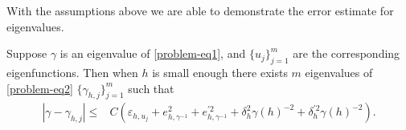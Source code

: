 \documentclass[leqno,CJK]{siamltex704}
\numberwithin{equation}{section}
\begin{document}
	With the assumptions above we are able to demonstrate the error estimate for eigenvalues.
	\begin{theorem}\label{thm-eigenvalue}
		Suppose $\gamma$ is an eigenvalue of \eqref{problem-eq1}, and $\{u_j\}_{j=1}^m$ are the corresponding eigenfunctions. Then when $h$ is  small enough there exists $m$ eigenvalues of
		\eqref{problem-eq2} $\{\gamma_{h,j}\}_{j=1}^m$ such that
		\begin{align*}
			|\gamma-\gamma_{h,j}|\le& C(\varepsilon_{h,u_j} + e_{h,\gamma^{-1}}^2 + e^{\prime 2}_{h,\gamma^{-1}}+ \delta_h^2\gamma(h)^{-2} + \delta^{\prime 2}_h\gamma(h)^{-2}) .
		\end{align*}
	\end{theorem}

	
\end{document}
